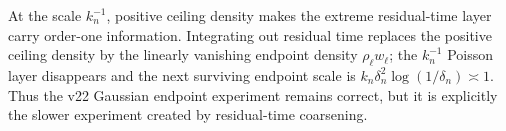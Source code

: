 \begin{remark}
\label{rem:v23-et-versus-endpoint}
At the scale \(k_n^{-1}\), positive ceiling density makes the extreme
residual-time layer carry order-one information.  Integrating out residual
time replaces the positive ceiling density by the linearly vanishing endpoint
density \(\rho_\ell w_\ell\); the \(k_n^{-1}\) Poisson layer disappears and
the next surviving endpoint scale is
\(k_n\delta_n^2\log(1/\delta_n)\asymp1\).  Thus the v22 Gaussian endpoint
experiment remains correct, but it is explicitly the slower experiment
created by residual-time coarsening.
\end{remark}
